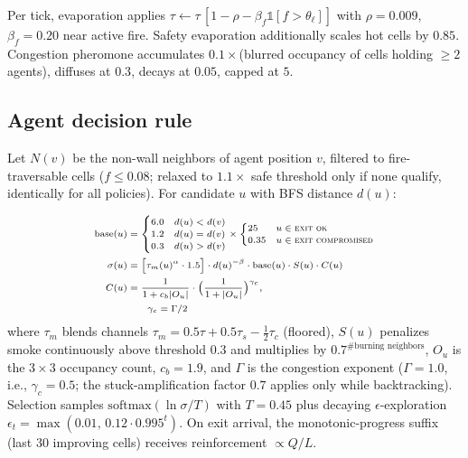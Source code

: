 ﻿\documentclass[conference]{IEEEtran}
\begin{document}
Per tick, evaporation applies $\tau\leftarrow\tau\,[1-\rho-\beta_f\mathbb{1}[f>\theta_{\ell}]]$ with $\rho{=}0.009$, $\beta_f{=}0.20$ near active fire. Safety evaporation additionally scales hot cells by $0.85$. Congestion pheromone accumulates $0.1\times$(blurred occupancy of cells holding $\geq2$ agents), diffuses at $0.3$, decays at $0.05$, capped at $5$.

\subsection{Agent decision rule}
Let $N(v)$ be the non-wall neighbors of agent position $v$, filtered to fire-traversable cells ($f\leq0.08$; relaxed to $1.1\times$ safe threshold only if none qualify, identically for all policies). For candidate $u$ with BFS distance $d(u)$:

\begin{equation}
\scriptsize
\begin{aligned}
\mathrm{base}(u)&=\begin{cases}6.0 & d(u)<d(v)\\ 1.2 & d(u)=d(v)\\ 0.3 & d(u)>d(v)\end{cases}
\times\begin{cases}25 & u\in\textsc{exit ok}\\ 0.35 & u\in\textsc{exit compromised}\end{cases}\\
\sigma(u)&=\bigl[\tau_m(u)^{\alpha}\cdot1.5\bigr]\cdot d(u)^{-\beta}\cdot\mathrm{base}(u)\cdot S(u)\cdot C(u)\\
C(u)&=\frac{1}{1+c_b |O_{u}|}\cdot\Bigl(\frac{1}{1+|O_{u}|}\Bigr)^{\gamma_c},\\
&\qquad \gamma_c=\Gamma/2
\end{aligned}
\label{eq:score}
\end{equation}
where $\tau_m$ blends channels $\tau_m=0.5\tau+0.5\tau_s-\tfrac12\tau_c$ (floored), $S(u)$ penalizes smoke continuously above threshold $0.3$ and multiplies by $0.7^{\#\text{burning neighbors}}$, $O_u$ is the $3\times3$ occupancy count, $c_b{=}1.9$, and $\Gamma$ is the congestion exponent ($\Gamma{=}1.0$, i.e., $\gamma_c{=}0.5$; the stuck-amplification factor $0.7$ applies only while backtracking). Selection samples $\mathrm{softmax}(\ln\sigma/T)$ with $T{=}0.45$ plus decaying $\epsilon$-exploration $\epsilon_t=\max(0.01,\,0.12\cdot0.995^{t})$. On exit arrival, the monotonic-progress suffix (last 30 improving cells) receives reinforcement $\propto Q/L$.
\end{document}
